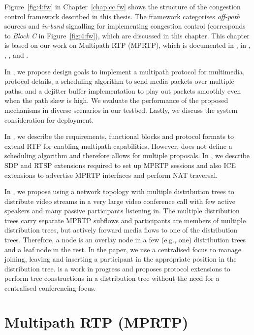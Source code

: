 Figure~\ref{fig:4:fw} in Chapter~\ref{chap:cc.fw} shows the structure of the
congestion control framework described in this thesis. The framework
categorises \emph{off-path} sources and \emph{in-band} signalling for
implementing congestion control (corresponds to \emph{Block C} in
Figure~\ref{fig:4:fw}), which are discussed in this chapter. This chapter is
based on our work on Multipath RTP (MPRTP), which is documented in
, in \cite{draft.mprtp}, \cite{draft.mprtp.sdp},
\cite{Globisch:AsymGrpComm}, and \cite{draft.rtcp.overlay}.

In , we propose design goals to implement a
multipath protocol for multimedia, protocol details, a scheduling algorithm to
send media packets over multiple paths, and a dejitter buffer implementation to
play out packets smoothly even when the path skew is high. We evaluate the
performance of the proposed mechanisms in diverse scenarios in our testbed.
Lastly, we discuss the system consideration for deployment.

In \cite{draft.mprtp}, we describe the requirements, functional blocks and
protocol formats to extend RTP for enabling multipath capabilities. However,
\cite{draft.mprtp} does not define a scheduling algorithm and therefore allows 
for multiple proposals. In \cite{draft.mprtp.sdp}, we describe SDP and RTSP extensions
required to set up MPRTP sessions and also ICE extensions to advertise MPRTP
interfaces and perform NAT traversal.

In \cite{Globisch:AsymGrpComm}, we propose using a network topology with
multiple distribution trees to distribute video streams in a very large
video conference call with few active speakers and many passive participants
listening in. The multiple distribution trees carry separate MPRTP subflows
and participants are members of multiple distribution trees, but actively
forward media flows to one of the distribution trees. Therefore, a node is an
overlay node in a few (e.g., one) distribution trees and a leaf node in the
rest. In the paper, we use a centralised focus to manage joining, leaving
and inserting a participant in the appropriate position in the distribution
tree. \cite{draft.rtcp.overlay} is a work in progress and proposes protocol
extensions to perform tree constructions in a distribution tree without the
need for a centralised conferencing focus.


\section{Multipath RTP (MPRTP)}

